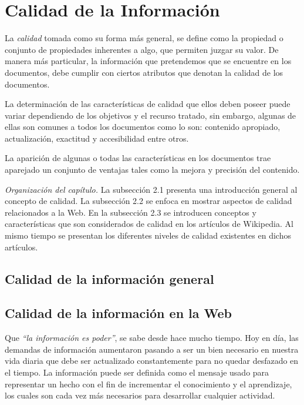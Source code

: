 \chapter{Calidad de la Informaci\'on}

La \emph{calidad} tomada como su forma m\'as general, se define como la propiedad o conjunto de propiedades inherentes a algo, que permiten juzgar su valor. De manera m\'as particular, la informaci\'on que pretendemos que se encuentre en los documentos, debe cumplir con ciertos atributos que denotan la calidad de los documentos.

La determinaci\'on de las caracter\'isticas de calidad que ellos deben poseer puede variar dependiendo de los objetivos y el recurso tratado, sin embargo, algunas de ellas son comunes a todos los documentos como lo son:  contenido apropiado, actualizaci\'on, exactitud y accesibilidad entre otros.

La aparici\'on de algunas o todas las caracter\'isticas en los documentos trae aparejado un conjunto de ventajas tales como la mejora y precisi\'on del contenido.

\emph{Organizaci\'on del cap\'itulo.} La subsecci\'on 2.1 presenta una introducci\'on general al concepto de calidad. La subsecci\'on 2.2 se enfoca en mostrar aspectos de calidad relacionados a la Web. En la subsecci\'on 2.3 se introducen conceptos y caracter\'isticas que son considerados de calidad en los art\'iculos de Wikipedia. Al mismo tiempo se presentan los diferentes niveles de calidad existentes en dichos art\'iculos.

\section{Calidad de la informaci\'on general}

\section{Calidad de la informaci\'on en la Web}

Que \emph{``la informaci\'on es poder''}, se sabe desde hace mucho tiempo. Hoy en d\'ia, las demandas de informaci\'on aumentaron pasando a ser un bien necesario en nuestra vida diaria que debe ser actualizado constantemente para no quedar desfazado en el tiempo.
La informaci\'on puede ser definida como el mensaje usado para representar un hecho con el fin de incrementar el conocimiento y el aprendizaje, los cuales son cada vez m\'as necesarios para desarrollar cualquier actividad.

